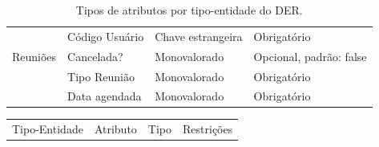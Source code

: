 \documentclass[11pt]{../../classes/ifscarticle}
\begin{document}
\begin{table}[h]
\begin{tabular}{ |p{}|p{3cm}|p{4cm}|p{}|  }
                    & Código Usuário      & Chave estrangeira & Obrigatório             \\
     Reuniões       & Cancelada?          & Monovalorado      & Opcional, padrão: false \\
                    & Tipo Reunião        & Monovalorado      & Obrigatório             \\
                    & Data agendada       & Monovalorado      & Obrigatório             \\
      \hline
    \end{tabular}
    \caption{Tipos de atributos por tipo-entidade do DER.}
  \end{table}
  \clearpage
\begin{table}[h]
  \centering
  \vspace{0.5cm}
  \begin{tabular}{ |p{}|p{3cm}|p{4cm}|p{}|  }
   
    \hline
    Tipo-Entidade & Atributo & Tipo & Restrições \\ %
   

\end{tabular}
\end{table}
\end{document}
